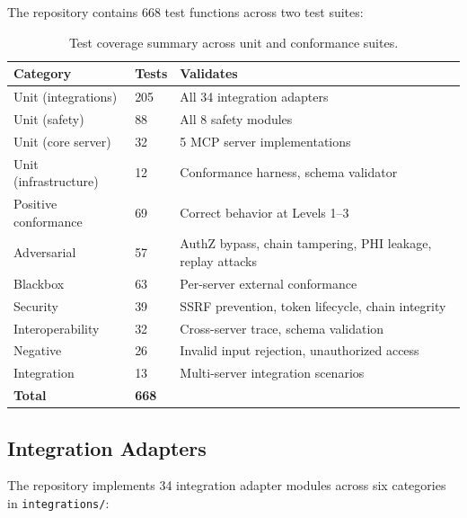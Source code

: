 The repository contains 668 test functions across two test suites:

\begin{table}[H]
\centering
\caption{Test coverage summary across unit and conformance suites.}
\label{tab:test-coverage}
\small
\begin{tabularx}{\textwidth}{@{}L{3cm}R{1.5cm}L{7cm}@{}}
\toprule
\textbf{Category} & \textbf{Tests} & \textbf{Validates} \\
\midrule
Unit (integrations) & 205 & All 34 integration adapters \\
Unit (safety) & 88 & All 8 safety modules \\
Unit (core server) & 32 & 5 MCP server implementations \\
Unit (infrastructure) & 12 & Conformance harness, schema validator \\
Positive conformance & 69 & Correct behavior at Levels 1--3 \\
Adversarial & 57 & AuthZ bypass, chain tampering, PHI leakage, replay attacks \\
Blackbox & 63 & Per-server external conformance \\
Security & 39 & SSRF prevention, token lifecycle, chain integrity \\
Interoperability & 32 & Cross-server trace, schema validation \\
Negative & 26 & Invalid input rejection, unauthorized access \\
Integration & 13 & Multi-server integration scenarios \\
\midrule
\textbf{Total} & \textbf{668} & \\
\bottomrule
\end{tabularx}
\end{table}

\subsection{Integration Adapters}

The repository implements 34 integration adapter modules across six categories in \texttt{integrations/}:

